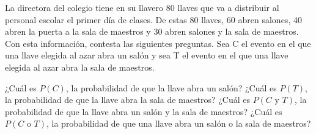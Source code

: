 La directora del colegio tiene en su llavero 80 llaves que va a distribuir al personal escolar
el primer día de clases. De estas 80 llaves, 60 abren salones, 40 abren la puerta a la sala de maestros y
30 abren salones y la sala de maestros. Con esta información, contesta las siguientes preguntas.
Sea C el evento en el que una llave elegida al azar abra un salón y sea T el evento en el que una
llave elegida al azar abra la sala de maestros.
\begin{parts}
    ¿Cuál es $P(C)$, la probabilidad de que la llave abra un salón?                                            \fillin[0.75]
    ¿Cuál es $P(T)$, la probabilidad de que la llave abra la sala de maestros?                                 \fillin[0.5]
    ¿Cuál es $P(C\text{ y }T)$, la probabilidad de que la llave abra un salón y la sala de maestros?   \fillin[0.375]
    ¿Cuál es $P(C\text{ o }T)$, la probabilidad de que una llave abra un salón o la sala de maestros?  \fillin[0.875]
\end{parts}
